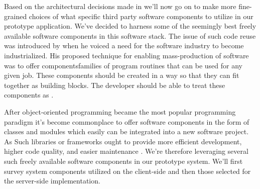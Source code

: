 Based on the architectural decisions made in 
 we'll now go on to make more fine-grained choices
of what specific third party software components to utilize in our prototype
application. We've decided to harness some of the seemingly best freely
available software components in this software stack. The issue of such code
reuse was introduced by \citet[]{mcilroy68} when he voiced a need
for the software industry to become industrialized. His proposed technique for
enabling mass-production of software was to offer components\dash{}families
of program routines that can be used for any given job. These components
should be created in a way so that they can fit together as building blocks.
The developer should be able to treat these components as .%

After object-oriented programming became the most popular
programming paradigm%
it's become commonplace to offer software components in the form of classes
and modules which easily can be integrated into a new software project.
As 
Such libraries or frameworks ought to provide more efficient development,
higher code quality, and easier maintenance \citep[]{stroustrup96}.
We're therefore leveraging several such freely available software components
in our prototype system. We'll first survey system components utilized
on the client-side and then those selected for the server-side implementation.


